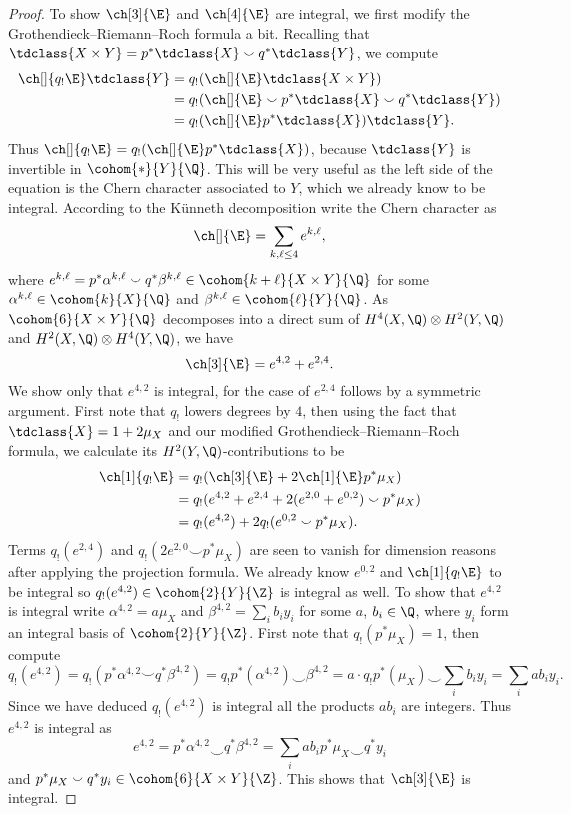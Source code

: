 \begin{proof}
    To show $\ch[3]{\E}$ and $\ch[4]{\E}$ are integral, we first modify the Grothendieck--Riemann--Roch formula a bit. Recalling that $\tdclass{X \times Y} = p^*\tdclass{X} \smallsmile q^*\tdclass{Y}$, we compute
    \begin{align*}
        \ch[]{q_!\E}\tdclass{Y} &= q_!(\ch[]{\E}\tdclass{X \times Y}) \\
        &= q_!(\ch[]{\E} \smallsmile p^*\tdclass{X} \smallsmile q^*\tdclass{Y}) \\
        &= q_!(\ch[]{\E}p^*\tdclass{X})\tdclass{Y}.  
    \end{align*} 
    Thus $\ch[]{q_!\E} = q_!(\ch[]{\E}p^*\tdclass{X})$, because $\tdclass{Y}$ is invertible in $\cohom{*}{Y}{\Q}$. This will be very useful as the left side of the equation is the Chern character associated to $Y$, which we already know to be integral. According to the Künneth decomposition write the Chern character as 
    \[
        \ch[]{\E} = \sum_{k,\ell \leq 4} e^{k,\ell},
    \]
    where $e^{k,\ell} = p^* \alpha^{k,\ell} \smallsmile q^*\beta^{k, \ell} \in \cohom{k+\ell}{X \times Y}{\Q}$ for some $\alpha^{k,\ell} \in \cohom{k}{X}{\Q}$ and $\beta^{k, \ell} \in \cohom{\ell}{Y}{\Q}$. As $\cohom{6}{X \times Y}{\Q}$ decomposes into a direct sum of $H^4(X, \Q) \otimes H^2(Y, \Q)$ and $H^2(X, \Q) \otimes H^4(Y, \Q)$, we have
    \[
        \ch[3]{\E} = e^{4,2} + e^{2,4}.
    \]
    We show only that $e^{4,2}$ is integral, for the case of $e^{2,4}$ follows by a symmetric argument. First note that $q_!$ lowers degrees by $4$, then using the fact that $\tdclass{X} = 1 + 2\mu_X$ and our modified Grothendieck--Riemann--Roch formula, we calculate its $H^2(Y, \Q)$-contributions to be
    \begin{align*}
        \ch[1]{q_!\E} &= q_!(\ch[3]{\E} + 2\ch[1]{\E}p^*\mu_X) \\
        &= q_!(e^{4,2} + e^{2,4} + 2(e^{2,0} + e^{0,2}) \smallsmile p^*\mu_X) \\
        &= q_!(e^{4,2}) + 2q_!(e^{0,2} \smallsmile p^*\mu_X).
    \end{align*}
    Terms $ q_!(e^{2,4})$ and $q_!(2e^{2,0} \smallsmile p^*\mu_X)$ are seen to vanish for dimension reasons after applying the projection formula. We already know $e^{0,2}$ and $\ch[1]{q_!\E}$ to be integral so $q_!(e^{4,2}) \in \cohom{2}{Y}{\Z}$ is integral as well. To show that $e^{4,2}$ is integral write $\alpha^{4,2} = a \mu_X$ and $\beta^{4,2} = \sum_i b_i y_i$ for some $a$, $b_i \in \Q$, where $y_i$ form an integral basis of $\cohom{2}{Y}{\Z}$. First note that $q_!(p^*\mu_X) = 1$, then compute
    \[
        q_!(e^{4,2}) = q_!(p^*\alpha^{4,2} \smallsmile q^*\beta^{4,2}) = q_!p^*(\alpha^{4,2}) \smallsmile \beta^{4,2} = a \cdot q_!p^*(\mu_X) \smallsmile \sum_i b_i y_i = \sum_i ab_i y_i.
    \]
    Since we have deduced $q_!(e^{4,2})$ is integral all the products $ab_i$ are integers. Thus $e^{4,2}$ is integral as
    \[
        e^{4,2} = p^*\alpha^{4,2} \smallsmile q^*\beta^{4,2} = \sum_i ab_i p^*\mu_X \smallsmile q^*y_i
    \]
    and $p^*\mu_X \smallsmile q^*y_i \in \cohom{6}{X \times Y}{\Z}$. This shows that $\ch[3]{\E}$ is integral.


\end{proof}
